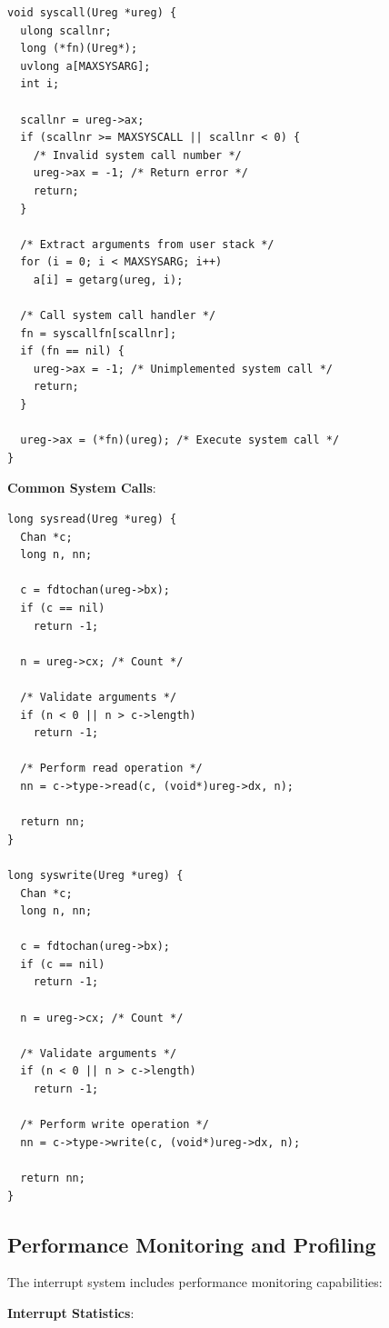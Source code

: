 \documentclass[11pt,letterpaper]{article}
\begin{document}
\begin{lstlisting}
void syscall(Ureg *ureg) {
  ulong scallnr;
  long (*fn)(Ureg*);
  uvlong a[MAXSYSARG];
  int i;
  
  scallnr = ureg->ax;
  if (scallnr >= MAXSYSCALL || scallnr < 0) {
    /* Invalid system call number */
    ureg->ax = -1; /* Return error */
    return;
  }
  
  /* Extract arguments from user stack */
  for (i = 0; i < MAXSYSARG; i++)
    a[i] = getarg(ureg, i);
  
  /* Call system call handler */
  fn = syscallfn[scallnr];
  if (fn == nil) {
    ureg->ax = -1; /* Unimplemented system call */
    return;
  }
  
  ureg->ax = (*fn)(ureg); /* Execute system call */
}
\end{lstlisting}

\textbf{Common System Calls}:

\begin{lstlisting}
long sysread(Ureg *ureg) {
  Chan *c;
  long n, nn;
  
  c = fdtochan(ureg->bx);
  if (c == nil)
    return -1;
  
  n = ureg->cx; /* Count */
  
  /* Validate arguments */
  if (n < 0 || n > c->length)
    return -1;
  
  /* Perform read operation */
  nn = c->type->read(c, (void*)ureg->dx, n);
  
  return nn;
}

long syswrite(Ureg *ureg) {
  Chan *c;
  long n, nn;
  
  c = fdtochan(ureg->bx);
  if (c == nil)
    return -1;
  
  n = ureg->cx; /* Count */
  
  /* Validate arguments */
  if (n < 0 || n > c->length)
    return -1;
  
  /* Perform write operation */
  nn = c->type->write(c, (void*)ureg->dx, n);
  
  return nn;
}
\end{lstlisting}

\subsection{Performance Monitoring and Profiling}

The interrupt system includes performance monitoring capabilities:

\textbf{Interrupt Statistics}:
\end{document}
